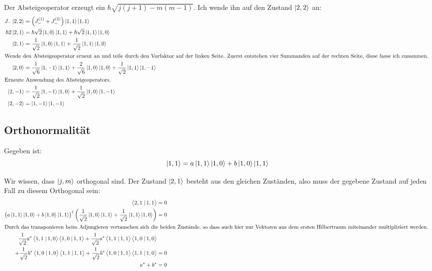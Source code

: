 Der Absteigeoperator erzeugt ein $\hbar \sqrt{j(j+1) - m(m-1)}$. Ich wende ihn auf den Zustand $\left| 2, 2 \right\rangle$ an:
\begin{align*}
	J_- \ket{2, 2}
	&= \del{J_-^{(1)} + J_-^{(2)}} \ket{1, 1} \ket{1, 1} \\
	\hbar 2 \ket{2, 1}
	&= \hbar \sqrt 2 \ket{1, 0} \ket{1, 1} + \hbar \sqrt 2 \ket{1, 1} \ket{1, 0} \\
	\ket{2, 1}
	&= \frac1{\sqrt 2} \ket{1, 0} \ket{1, 1} + \frac1{\sqrt 2} \ket{1, 1} \ket{1, 0} \\
	\intertext{%
		Wende den Absteigeoperator erneut an und teile durch den Vorfaktor auf
		der linken Seite. Zuerst entstehen vier Summanden auf der rechten
		Seite, diese fasse ich zusammen.
	}
	\ket{2, 0}
	&= \frac1{\sqrt 6} \ket{1, -1} \ket{1, 1}
	+ \frac2{\sqrt 6} \ket{1, 0} \ket{1, 0}
	+ \frac1{\sqrt 2} \ket{1, 1} \ket{1, -1} \\
	\intertext{%
		Erneute Anwendung des Absteigeoperators.
	}
	\ket{2, -1}
	&= \frac1{\sqrt 2} \ket{1, -1} \ket{1, 0}
	+ \frac1{\sqrt 2} \ket{1, 0} \ket{1, -1} \\
	\ket{2, -2}
	&= \ket{1, -1} \ket{1, -1}
\end{align*}

\subsection{Orthonormalität}

Gegeben ist:
\[
	\left| 1, 1 \right\rangle = a \left| 1, 1 \right\rangle \left| 1, 0 \right\rangle + b \left| 1, 0 \right\rangle \left| 1, 1 \right\rangle
\]

Wir wissen, dass $\left| j, m \right\rangle$ orthogonal sind. Der Zustand $\left| 2, 1 \right\rangle$ besteht
aus den gleichen Zuständen, also muss der gegebene Zustand auf jeden Fall zu
diesem Orthogonal sein:
\begin{align*}
	\braket{2, 1}{1, 1} &= 0 \\
	\del{a \ket{1, 1} \ket{1, 0} + b \ket{1, 0} \ket{1, 1}}^\dagger
	\del{\frac1{\sqrt 2} \ket{1, 0} \ket{1, 1} + \frac1{\sqrt 2} \ket{1, 1} \ket{1, 0}}
	&= 0 \\
	\intertext{%
		Durch das transponieren beim Adjungieren vertauschen sich die beiden
		Zustände, so dass auch hier nur Vektoren aus dem ersten Hilbertraum
		miteinander multipliziert werden.
	}
	\frac1{\sqrt2} a^* \braket{1, 1}{1, 0} \braket{1, 0}{1, 1}
	+ \frac1{\sqrt2} a^* \braket{1, 1}{1, 1} \braket{1, 0}{1, 0} \\
	+ \frac1{\sqrt2} b^* \braket{1, 0}{1, 0} \braket{1, 1}{1, 1}
	+ \frac1{\sqrt2} b^* \braket{1, 0}{1, 1} \braket{1, 1}{1, 0}
	&= 0 \\
	a^* + b^* &= 0
\end{align*}

